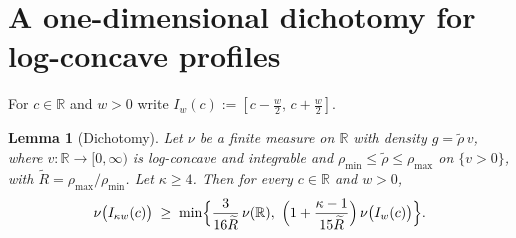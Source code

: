 \documentclass[11pt]{article}
\newtheorem{lemma}[theorem]{Lemma}
\newcommand{\R}{\mathbb{R}}
\begin{document}
\section{A one-dimensional dichotomy for log-concave profiles}\label{sec:1d}

For $c\in\R$ and $w>0$ write $I_w(c):=[c-\frac w2,\,c+\frac w2]$.

\begin{lemma}[Dichotomy]\label{lem:1d}
Let $\nu$ be a finite measure on $\R$ with density $g=\tilde\rho\,v$, where
$v:\R\to[0,\infty)$ is log-concave and integrable and
$\rho_{\min}\le\tilde\rho\le\rho_{\max}$ on $\{v>0\}$, with
$\widetilde R=\rho_{\max}/\rho_{\min}$.  Let $\kappa\ge4$.  Then for every $c\in\R$
and $w>0$,
\[
\nu\bigl(I_{\kappa w}(c)\bigr)\;\ge\;
\min\Bigl\{\frac{3}{16\widetilde R}\,\nu(\R),\
\Bigl(1+\frac{\kappa-1}{15\widetilde R}\Bigr)\,\nu\bigl(I_w(c)\bigr)\Bigr\}.
\]
\end{lemma}
\end{document}
